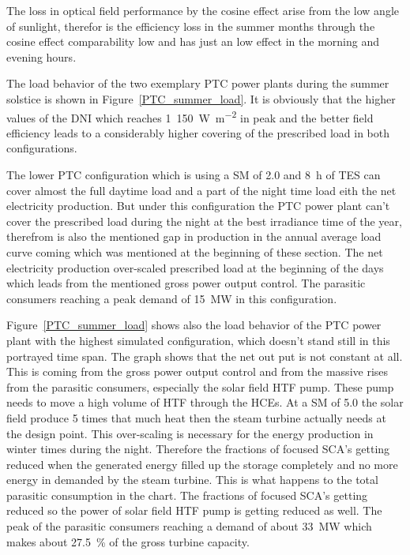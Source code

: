The loss in optical field performance by the cosine effect arise from the low angle of sunlight, therefor is the efficiency loss in the summer months through the cosine effect comparability low and has just an low effect in the morning and evening hours. 

The load behavior of the two exemplary PTC power plants during the summer solstice is shown in Figure~\ref{PTC_summer_load}. It is obviously that the higher values of the DNI which reaches 1~\SI{150}{\watt\per\square\metre} in peak and the better field efficiency leads to a considerably higher covering of the prescribed load in both configurations. 

The lower PTC configuration which is using a SM of 2.0 and \SI{8}{h} of TES can cover almost the full daytime load and a part of the night time load eith the net electricity production. But under this configuration the PTC power plant can't cover the prescribed load during the night at the best irradiance time of the year, therefrom is also the mentioned gap in production in the annual average load curve coming which was mentioned at the beginning of these section. The net electricity production over-scaled prescribed load at the beginning of the days which leads from the mentioned gross power output control. The parasitic consumers reaching a peak demand of \SI{15}{MW} in this configuration. 

Figure~\ref{PTC_summer_load} shows also the load behavior of the PTC power plant with the highest simulated configuration, which doesn't stand still in this portrayed time span. The graph shows that the net out put is not constant at all. This is coming from the gross power output control and from the massive rises from the parasitic consumers, especially the solar field HTF pump. These pump needs to move a high volume of HTF through the HCEs. At a SM of 5.0 the solar field produce 5 times that much heat then the steam turbine actually needs at the design point. This over-scaling is necessary for the energy production in winter times during the night. Therefore the fractions of focused SCA's getting reduced when the generated energy filled up the storage completely and no more energy in demanded by the steam turbine. This is what  happens to the total parasitic consumption in the chart. The fractions of focused SCA's getting reduced so the power of solar field HTF pump is getting reduced as well. The peak of the parasitic consumers reaching a demand of about \SI{33}{MW} which makes about 27.5~\% of the gross turbine capacity.


